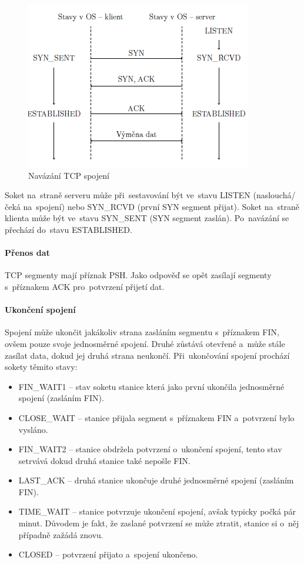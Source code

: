 \begin{figure}[ht]
	\centering
	\includegraphics[scale=1]{images/network_three_handshake.png}
	\caption{Navázání TCP spojení}
	\label{network_three_handshake}
\end{figure}

Soket na~straně serveru může při~sestavování být ve~stavu LISTEN (naslouchá/čeká na~spojení) nebo SYN\_RCVD (první SYN segment přijat). Soket na~straně klienta může být ve~stavu SYN\_SENT (SYN segment zaslán). Po~navázání se přechází do~stavu ESTABLISHED.

\paragraph{Přenos dat}

TCP segmenty mají příznak PSH. Jako odpověď se opět zasílají segmenty s~příznakem ACK pro~potvrzení přijetí dat.

\paragraph{Ukončení spojení}

Spojení může ukončit jakákoliv strana zasláním segmentu s~příznakem FIN, ovšem pouze svoje jednosměrné spojení. Druhé zůstává otevřené a~může stále zasílat data, dokud jej druhá strana neukončí. Při~ukončování spojení prochází sokety těmito stavy:
\begin{itemize}
	\item FIN\_WAIT1 -- stav soketu stanice která jako první ukončila jednosměrné spojení (zasláním FIN).
	\item CLOSE\_WAIT -- stanice přijala segment s~příznakem FIN a~potvrzení bylo vysláno.
	\item FIN\_WAIT2 -- stanice obdržela potvrzení o~ukončení spojení, tento stav setrvává dokud druhá stanice také nepošle FIN.
	\item LAST\_ACK -- druhá stanice ukončuje druhé jednosměrné spojení (zasláním FIN).
	\item TIME\_WAIT -- stanice potvrzuje ukončení spojení, avšak typicky počká pár minut. Důvodem je fakt, že zaslané potvrzení se může ztratit, stanice si o~něj případně zažádá znovu.
	\item CLOSED -- potvrzení přijato a~spojení ukončeno.
\end{itemize}

